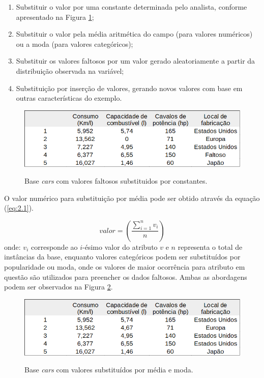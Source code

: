 \begin{enumerate}[label=\roman*.]
    \item Substituir o valor por uma constante determinada pelo analista, conforme apresentado na Figura \ref{fig:cars-labels};
    \item Substituir o valor pela média aritmética do campo (para valores numéricos) ou a moda (para valores categóricos);
    \item Substituir os valores faltosos por um valor gerado aleatoriamente a partir da distribuição observada na variável;
    \item Substituição por inserção de valores, gerando novos valores com base em outras características do exemplo.
\end{enumerate}

\begin{figure}[H]
    \centering
    \caption{Base \textit{cars} com valores faltosos substituidos por constantes.}
    \includegraphics[width=\linewidth]{figuras/cars-constants.png}
    \label{fig:cars-labels}
\end{figure}

O valor numérico para substituição por média pode ser obtido através da equação (\ref{eq:2.1}).

\begin{equation}
    valor = \left ( \frac{\sum_{i=1}^{n} v_i}{n} \right )
    \label{eq:2.1}
\end{equation}
onde: $v_i$ corresponde ao $i$-ésimo valor do atributo $v$ e $n$ representa o total de instâncias da base, enquanto valores categóricos podem ser substituídos por popularidade ou moda, onde os valores de maior ocorrência para atributo em questão são utilizados para preencher os dados faltosos. Ambas as abordagens podem ser observados na Figura \ref{fig:cars-mean-trend}.

\begin{figure}[H]
    \centering
    \caption{Base \textit{cars} com valores substituídos por média e moda.}
    \includegraphics[width=\linewidth]{figuras/cars-mean-trend.png}
    \label{fig:cars-mean-trend}
\end{figure}

